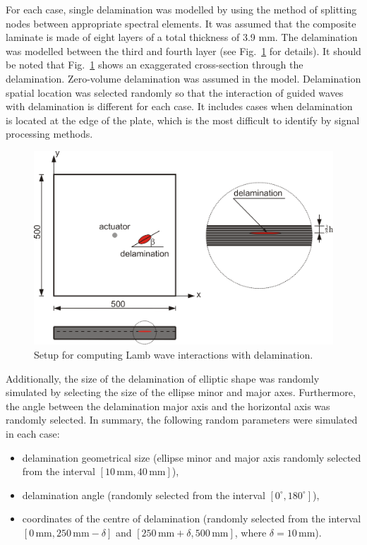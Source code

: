 For each case, single delamination was modelled by using the method of splitting nodes between appropriate spectral elements. 
It was assumed that the composite laminate is made of eight layers of a total thickness of 3.9 mm.
The delamination was modelled between the third and fourth layer (see Fig.~\ref{fig:plate_setup} for details).
It should be noted that Fig.~\ref{fig:plate_setup} shows an exaggerated cross-section through the delamination. 
Zero-volume delamination was assumed in the model. 
Delamination spatial location was selected randomly so that the interaction of guided waves with delamination is different for each case.
It includes cases when delamination is located at the edge of the plate, which is the most difficult to identify by signal processing methods.
\begin{figure}
	\centering
	\includegraphics[scale=1]{Figures/Chapter_4/plate_delam_arrangement_MSSP.PNG}
	\caption{Setup for computing Lamb wave interactions with delamination.}
	\label{fig:plate_setup}
\end{figure}
Additionally, the size of the delamination of elliptic shape was randomly simulated by selecting the size of the ellipse minor and major axes.
Furthermore, the angle between the delamination major axis and the horizontal axis was randomly selected.
In summary, the following random parameters were simulated in each case:
\begin{itemize}
	\item delamination geometrical size	(ellipse minor and major axis randomly selected from the interval \(\left[10 \, \textrm{mm}, 40\, \textrm{mm}\right]\)),
	\item delamination angle (randomly selected from the interval \( \left[ 0^{\circ}, 180^{\circ} \right]\)),
	\item coordinates of the centre of delamination (randomly selected from the interval \(\left[0\, \textrm{mm}, 250\, \textrm{mm} -\delta \right]\) and \( \left[250\, \textrm{mm}+\delta, 500\, \textrm{mm} \right] \), where \(\delta = 10\, \textrm{mm}\)).
\end{itemize}

